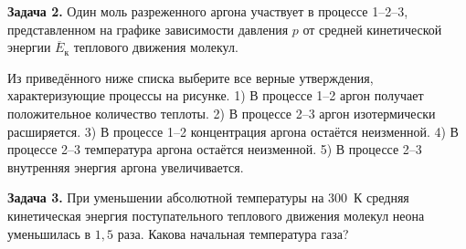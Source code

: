 \begin{taskbasic}[code={\label{task:mkt_v2_n9}}]
\textbf{Задача 2.} Один моль разреженного аргона участвует в процессе 1–2–3, представленном на графике зависимости давления $p$ от средней кинетической энергии $\overline{E}_{\text{к}}$ теплового движения молекул.

\nopagebreak\smallskip
\begin{center}
\end{center}

Из приведённого ниже списка выберите все верные утверждения, характеризующие процессы на рисунке.
1) В процессе 1–2 аргон получает положительное количество теплоты.
2) В процессе 2–3 аргон изотермически расширяется.
3) В процессе 1–2 концентрация аргона остаётся неизменной.
4) В процессе 2–3 температура аргона остаётся неизменной.
5) В процессе 2–3 внутренняя энергия аргона увеличивается.

\end{taskbasic}

\begin{taskbasic}[code={\label{task:mkt_v3_n7}}]
\textbf{Задача 3.} При уменьшении абсолютной температуры на $300$~К средняя кинетическая энергия поступательного теплового движения молекул неона уменьшилась в $1{,}5$ раза. Какова начальная температура газа?

\end{taskbasic}

